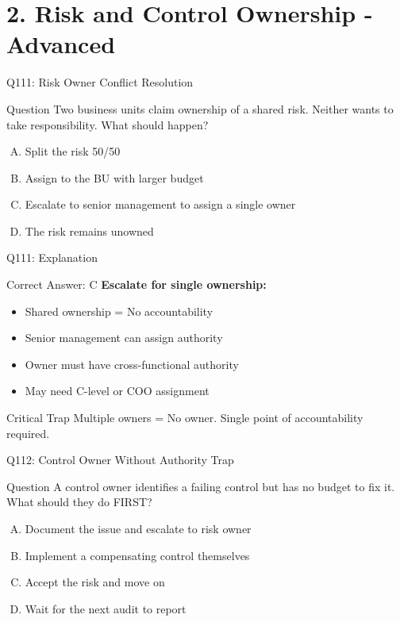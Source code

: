 \documentclass{beamer}
\begin{document}
	
	\section{2. Risk and Control Ownership - Advanced}
	
	\begin{frame}{Q111: Risk Owner Conflict Resolution}
		\begin{block}{Question}
			Two business units claim ownership of a shared risk. Neither wants to take responsibility. What should happen?
		\end{block}
		\begin{enumerate}[(A)]
			\item Split the risk 50/50
			\item Assign to the BU with larger budget
			\item Escalate to senior management to assign a single owner
			\item The risk remains unowned
		\end{enumerate}
	\end{frame}
	
	\begin{frame}{Q111: Explanation}
		\begin{block}{Correct Answer: C}
			\textbf{Escalate for single ownership:}
			\begin{itemize}
				\item Shared ownership = No accountability
				\item Senior management can assign authority
				\item Owner must have cross-functional authority
				\item May need C-level or COO assignment
			\end{itemize}
		\end{block}
		\begin{alertblock}{Critical Trap}
			Multiple owners = No owner.
			Single point of accountability required.
		\end{alertblock}
	\end{frame}
	
	\begin{frame}{Q112: Control Owner Without Authority Trap}
		\begin{block}{Question}
			A control owner identifies a failing control but has no budget to fix it. What should they do FIRST?
		\end{block}
		\begin{enumerate}[(A)]
			\item Document the issue and escalate to risk owner
			\item Implement a compensating control themselves
			\item Accept the risk and move on
			\item Wait for the next audit to report
		\end{enumerate}
	\end{frame}
	
\end{document}
